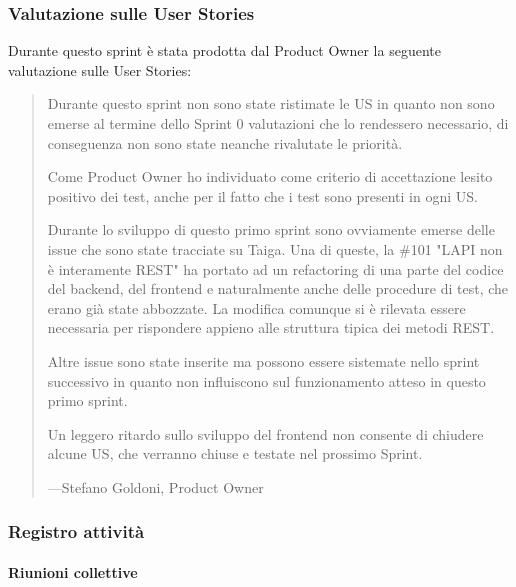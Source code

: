 \documentclass[letterpaper,10pt,italian]{sphinxmanual}
\begin{document}
\subsubsection{Valutazione sulle User Stories}
\label{\detokenize{development/sprint1/index:valutazione-sulle-user-stories}}
\sphinxAtStartPar
Durante questo sprint è stata prodotta dal Product Owner la seguente valutazione sulle User Stories:
\begin{quote}

\sphinxAtStartPar
Durante questo sprint non sono state ristimate le US in quanto non sono emerse al termine dello Sprint 0
valutazioni che lo rendessero necessario, di conseguenza non sono state neanche rivalutate le priorità.

\sphinxAtStartPar
Come Product Owner ho individuato come criterio di accettazione l\textquotesingle{}esito positivo dei test, anche per il fatto che
i test sono presenti in ogni US.

\sphinxAtStartPar
Durante lo sviluppo di questo primo sprint sono ovviamente emerse delle issue che sono state tracciate su Taiga.
Una di queste, la \#101 "L\textquotesingle{}API non è interamente REST" ha portato ad un refactoring di una parte del codice del
backend, del frontend e naturalmente anche delle procedure di test, che erano già state abbozzate.
La modifica comunque si è rilevata essere necessaria per rispondere appieno alle struttura tipica dei metodi REST.

\sphinxAtStartPar
Altre issue sono state inserite ma possono essere sistemate nello sprint successivo in quanto non influiscono sul
funzionamento atteso in questo primo sprint.

\sphinxAtStartPar
Un leggero ritardo sullo sviluppo del frontend non consente di chiudere alcune US, che verranno chiuse e
testate nel prossimo Sprint.

\begin{flushright}
---Stefano Goldoni, Product Owner
\end{flushright}
\end{quote}


\subsubsection{Registro attività}
\label{\detokenize{development/sprint1/index:registro-attivita}}

\paragraph{Riunioni collettive}
\label{\detokenize{development/sprint1/index:riunioni-collettive}}
\end{document}
